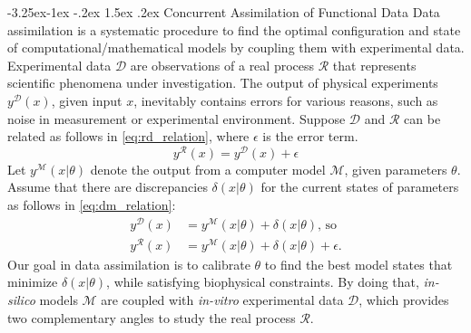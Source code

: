 \documentclass[11pt]{article}
\makeatletter
\renewcommand\subsection{\@startsection{subsection}{2}{\z@}%
                                     {-3.25ex\@plus -1ex \@minus -.2ex}%
                                     {1.5ex \@plus .2ex}%
                                     {\normalfont\fontfamily{phv}\fontsize{14}{17}\bfseries}}
\makeatother
\begin{document}
\subsection{Concurrent Assimilation of Functional Data}
Data assimilation is a systematic procedure to find the optimal configuration and state of computational/mathematical models by coupling them with experimental data. Experimental data $\mathcal{D}$ are observations of a real process $\mathcal{R}$ that represents scientific phenomena under investigation. The output of physical experiments $y^{\mathcal{D}}(x)$, given input $x$, inevitably contains errors for various reasons, such as noise in measurement or experimental environment. Suppose $\mathcal{D}$ and $\mathcal{R}$ can be related as follows in \eqref{eq:rd_relation}, where $\epsilon$ is the error term. 
\begin{equation}
    \label{eq:rd_relation}
    y^{\mathcal{R}}(x) = y^{\mathcal{D}}(x) + \epsilon
\end{equation}
Let $y^{\mathcal{M}}(x|\theta)$ denote the output from a computer model $\mathcal{M}$, given parameters $\theta$. Assume that there are discrepancies $\delta(x|\theta)$ for the current states of parameters as follows in \eqref{eq:dm_relation}:
\begin{align}
    \label{eq:dm_relation}
    y^{\mathcal{D}}(x) &= y^{\mathcal{M}}(x|\theta) + \delta(x|\theta) \text{, so} \\
    y^{\mathcal{R}}(x) &= y^{\mathcal{M}}(x|\theta) + \delta(x|\theta) + \epsilon.
\end{align}
Our goal in data assimilation is to calibrate $\theta$ to find the best model states that minimize $\delta(x|\theta)$, while satisfying biophysical constraints. By doing that, \textit{in-silico} models $\mathcal{M}$ are coupled with \textit{in-vitro} experimental data $\mathcal{D}$, which provides two complementary angles to study the real process $\mathcal{R}$.
\end{document}
